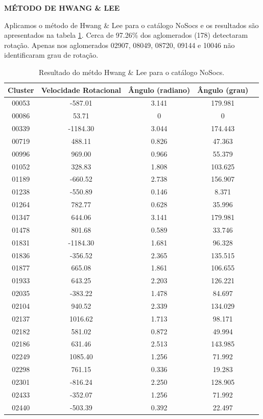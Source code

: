 \textbf{MÉTODO DE HWANG \& LEE}

Aplicamos o método de Hwang \& Lee para o catálogo NoSocs e os resultados são apresentados na tabela \ref{tab:nosocshwang}. Cerca de 97.26\% dos aglomerados (178) detectaram rotação. Apenas nos aglomerados 02907, 08049, 08720, 09144 e 10046 não identificaram grau de rotação.

{\scriptsize
\begin{longtable}{ccccc}
\caption{Resultado do métdo Hwang \& Lee para o catálogo NoSocs.}\label{tab:nosocshwang}
\\ \hline
\textbf{Cluster} & \textbf{Velocidade Rotacional} & \textbf{Ângulo (radiano)} & \textbf{Ângulo (grau)} \\ \hline
00053 & -587.01 & 3.141 & 179.981\\
00086 & 53.71 & 0 & 0\\
00339 & -1184.30 & 3.044 & 174.443\\
00719 & 488.11 & 0.826 & 47.363\\
00996 & 969.00 & 0.966 & 55.379\\
01052 & 328.83 & 1.808 & 103.625\\
01189 & -660.52 & 2.738 & 156.907\\
01238 & -550.89 & 0.146 & 8.371\\
01264 & 782.77 & 0.628 & 35.996\\
01347 & 644.06 & 3.141 & 179.981\\
01478 & 801.68 & 0.589 & 33.746\\
01831 & -1184.30 & 1.681 & 96.328\\
01836 & -356.52 & 2.365 & 135.515\\
01877 & 665.08 & 1.861 & 106.655\\
01933 & 643.25 & 2.203 & 126.221\\
02035 & -383.22 & 1.478 & 84.697\\
02104 & 940.52 & 2.339 & 134.029\\
02137 & 1016.62 & 1.713 & 98.171\\
02182 & 581.02 & 0.872 & 49.994\\
02186 & 631.46 & 2.513 & 143.985\\
02249 & 1085.40 & 1.256 & 71.992\\
02298 & 761.15 & 0.336 & 19.283\\
02301 & -816.24 & 2.250 & 128.905\\
02433 & -352.07 & 1.256 & 71.992\\
02440 & -503.39 & 0.392 & 22.497\\

\end{longtable}}

